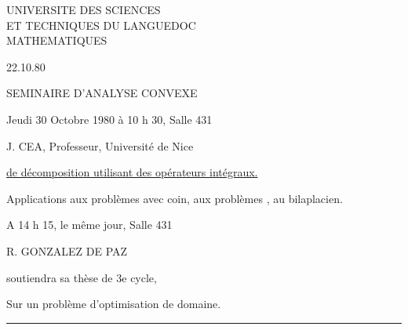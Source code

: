 
\begin{flushleft}
UNIVERSITE DES SCIENCES\\
ET TECHNIQUES DU LANGUEDOC\\
MATHEMATIQUES
\end{flushleft}
\begin{flushright}22.10.80\end{flushright}

\begin{center}
SEMINAIRE D'ANALYSE CONVEXE

Jeudi 30 Octobre 1980 à 10 h 30, Salle 431

J. CEA, Professeur, Université de Nice
\end{center}

\uline{ de décomposition utilisant des opérateurs intégraux.}

Applications aux problèmes avec coin, aux problèmes , au bilaplacien.

A 14 h 15, le même jour, Salle 431

\begin{center}R. GONZALEZ DE PAZ\end{center}

soutiendra sa thèse de 3e cycle,

\begin{center}
Sur un problème d'optimisation de domaine.

\rule{3cm}{.4pt}
\end{center}

